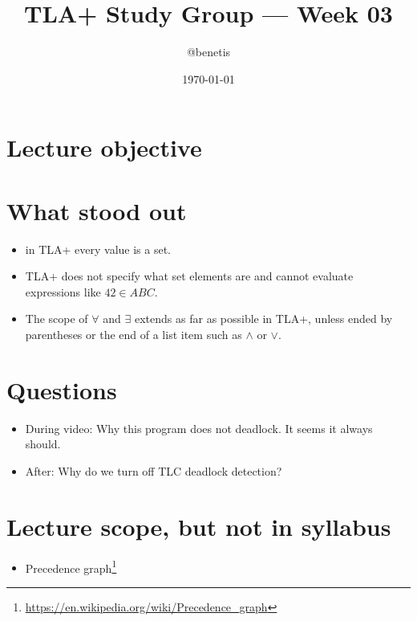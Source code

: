 \documentclass[11pt]{article}
\title{TLA+ Study Group — Week 03}
\author{@benetis}
\date{\today}
\begin{document}
\maketitle

\section*{Lecture objective}

\section*{What stood out}
\begin{itemize}
    \item in TLA+ every value is a set. 
    \item TLA+ does not specify what set elements are and cannot evaluate expressions like $42 \in ABC$.
    \item The scope of $\forall$ and $\exists$ extends as far as possible in TLA+, unless ended by parentheses or the end of a list item such as $\land$ or $\lor$.
\end{itemize}

\section*{Questions}
\begin{itemize}
    \item During video: Why this program does not deadlock. It seems it always should.
    \item After: Why do we turn off TLC deadlock detection?
\end{itemize}

\section*{Lecture scope, but not in syllabus}
\begin{itemize}
    \item Precedence graph\footnote{\url{https://en.wikipedia.org/wiki/Precedence_graph}}
\end{itemize}
\end{document}
